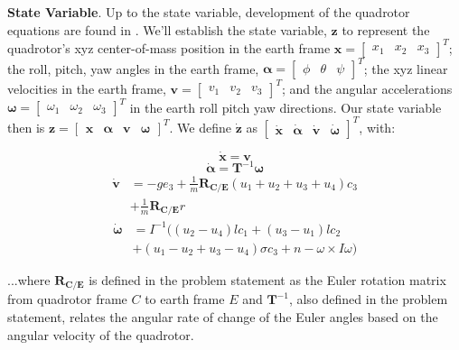 \documentclass{article}
\begin{document}
\begin{multicols}{2}
\noindent \textbf{State Variable}.  Up to the state variable, development of the quadrotor equations are found in \cite{FaalD}.  We'll establish the state variable, $\mathbf{z}$ to represent the quadrotor's xyz 
center-of-mass position in the earth 
frame $\mathbf{x}=\begin{bmatrix}x_1 & x_2 & x_3\end{bmatrix}^T$; the roll, pitch, yaw angles in the earth frame, $\bm{\alpha}
=\begin{bmatrix}\phi & \theta & \psi\end{bmatrix}^T$; the xyz linear velocities in the earth frame, $\mathbf{v}=\begin{bmatrix}v_1 & 
v_2 & v_3\end{bmatrix}^T$; and the angular accelerations $\bm{\omega}=\begin{bmatrix}\omega_1 & \omega_2 & 
\omega_3\end{bmatrix}^T$ in the earth roll pitch yaw directions. Our state variable then is $\mathbf{z}=\begin{bmatrix}\mathbf{x}
&\bm{\alpha}&\mathbf{v}&\bm{\omega}\end{bmatrix}^T$. We define $\boldsymbol{\dot{z}}$ as $\begin{bmatrix} \mathbf{\dot{x}}
&\bm{\dot{\alpha}}&\mathbf{\dot{v}}&\bm{\dot{\omega}} \end{bmatrix}^T$, with:

\begin{equation}
    \mathbf{\dot{x}} =\mathbf{v}
\end{equation}
\begin{equation}
    \bm{\dot{\alpha}} =\mathbf{T}^{-1}\bm{\omega}
\end{equation}
\begin{align}
    \mathbf{\dot{v}} &=-ge_3+\frac{1}{m}\mathbf{R_{C/E}}(u_1+u_2+u_3+u_4)c_3 \nonumber\\ &+\frac{1}{m}\mathbf{R_{C/E}}r
\end{align}
\begin{align}
    \bm{\dot{\omega}} &=I^{-1}((u_2-u_4)lc_1+(u_3-u_1)lc_2 \nonumber\\ &+(u_1-u_2+u_3-u_4)\sigma c_3+n-\omega \times I \omega)
\end{align}

\noindent ...where $\mathbf{R_{C/E}}$ is defined in the problem statement as the Euler rotation matrix from quadrotor frame $C$ to earth frame $E$ and $\mathbf{T}^{-1}$, also defined in the problem statement, relates the angular rate of change of the Euler angles based on the angular velocity of the quadrotor.


\end{multicols}
\end{document}
